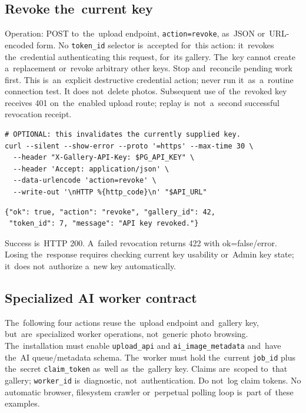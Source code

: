 \documentclass[11pt,a4paper]{article}
\newcommand{\codeword}[1]{\nolinkurl{#1}}
\begin{document}
\subsection{\texorpdfstring{Revoke the~current key}{Revoke the current key}}

\label{api352:revoke}

Operation: POST to~the~upload endpoint, \codeword{action=revoke}, as~JSON or~URL-encoded
form. No \codeword{token_id} selector is~accepted for~this action: it~revokes the~credential
authenticating this request, for~its gallery. The~key cannot create a~replacement or~revoke
arbitrary other keys. Stop and~reconcile pending work first. This is~an~explicit destructive
credential action; never run it~as~a~routine connection test. It does not~delete photos.
Subsequent use of~the~revoked key receives 401 on~the~enabled upload route; replay
is~not~a~second successful revocation receipt.

\begin{lstlisting}[language={}]
# OPTIONAL: this invalidates the currently supplied key.
curl --silent --show-error --proto '=https' --max-time 30 \
  --header "X-Gallery-API-Key: $PG_API_KEY" \
  --header 'Accept: application/json' \
  --data-urlencode 'action=revoke' \
  --write-out '\nHTTP %{http_code}\n' "$API_URL"
\end{lstlisting}

\begin{lstlisting}[language={}]
{"ok": true, "action": "revoke", "gallery_id": 42,
 "token_id": 7, "message": "API key revoked."}
\end{lstlisting}

Success is~HTTP 200. A~failed revocation returns 422 with ok=false/error. Losing
the~response requires checking current key usability or~Admin key state; it~does
not~authorize a~new key automatically.

\subsection{\texorpdfstring{Specialized AI worker contract}{Specialized AI worker contract}}

\label{api352:ai-contract}

The~following four actions reuse the~upload endpoint and~gallery key, but~are~specialized
worker operations, not~generic photo browsing. The~installation must enable
\codeword{upload_api} and \codeword{ai_image_metadata} and~have the~AI queue/metadata
schema. The~worker must hold the~current \codeword{job_id} plus the~secret
\codeword{claim_token} as~well as~the~gallery key. Claims are~scoped to~that gallery;
\codeword{worker_id} is~diagnostic, not~authentication. Do not~log claim tokens. No
automatic browser, filesystem crawler or~perpetual polling loop is~part of~these examples.
\end{document}
